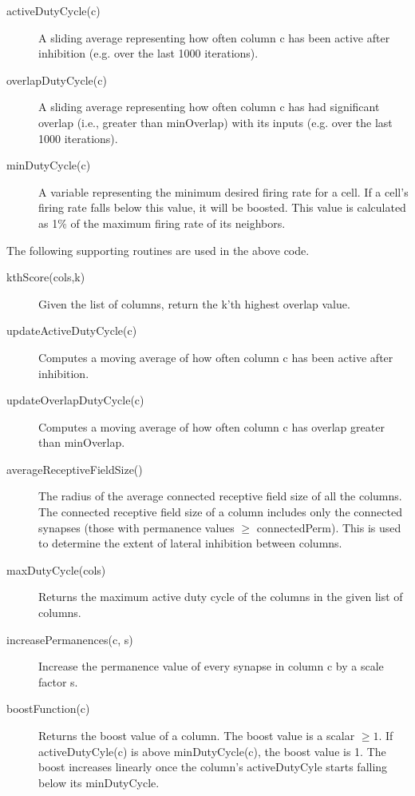 \documentclass{report}
\begin{document}
\begin{description}
\item[activeDutyCycle(c)] A sliding average representing how often
  column c has been active after inhibition (e.g. over the last 1000
  iterations).
\item[overlapDutyCycle(c)] A sliding average representing how often
  column c has had significant overlap (i.e., greater than minOverlap)
  with its inputs (e.g. over the last 1000 iterations).
\item[minDutyCycle(c)] A variable representing the minimum desired
  firing rate for a cell. If a cell's firing rate falls below this
  value, it will be boosted. This value is calculated as 1\% of the
  maximum firing rate of its neighbors.
\end{description}

The following supporting routines are used in the above code.

\begin{description}
\item[kthScore(cols,k)] Given the list of columns, return the k'th
  highest overlap value.

\item[updateActiveDutyCycle(c)] Computes a moving average of how often
  column c has been active after inhibition.

\item[updateOverlapDutyCycle(c)] Computes a moving average of how
  often column c has overlap greater than minOverlap.

\item[averageReceptiveFieldSize()] The radius of the average connected
  receptive field size of all the columns. The connected receptive
  field size of a column includes only the connected synapses (those
  with permanence values $\ge$ connectedPerm). This is used to determine
  the extent of lateral inhibition between columns.

\item[maxDutyCycle(cols)] Returns the maximum active duty cycle of the
  columns in the given list of columns.

\item[increasePermanences(c, s)] Increase the permanence value of
  every synapse in column c by a scale factor s.

\item[boostFunction(c)] Returns the boost value of a column. The boost
  value is a scalar $\ge 1$. If activeDutyCyle(c) is above
  minDutyCycle(c), the boost value is 1. The boost increases linearly
  once the column's activeDutyCyle starts falling below its
  minDutyCycle.
\end{description}
\end{document}
